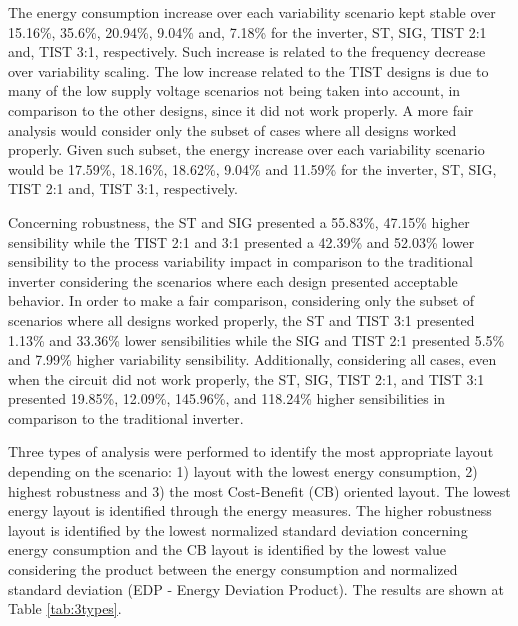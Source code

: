 \documentclass[pgmicro,mestrado,english]{iiufrgs}
\begin{document}
    The energy consumption increase over each variability scenario kept stable over 15.16\%, 35.6\%, 20.94\%, 9.04\% and, 7.18\% for the inverter, ST, SIG, TIST 2:1 and, TIST 3:1, respectively. Such increase is related to the frequency decrease over variability scaling. The low increase related to the TIST designs is due to many of the low supply voltage scenarios not being taken into account, in comparison to the other designs, since it did not work properly. A more fair analysis would consider only the subset of cases where all designs worked properly. Given such subset, the energy increase over each variability scenario would be 17.59\%, 18.16\%, 18.62\%, 9.04\% and 11.59\% for the inverter, ST, SIG, TIST 2:1 and, TIST 3:1, respectively.
    
    
    
    Concerning robustness, the ST and SIG presented a 55.83\%, 47.15\% higher sensibility while the TIST 2:1 and 3:1 presented a 42.39\% and 52.03\% lower sensibility to the process variability impact in comparison to the traditional inverter considering the scenarios where each design presented acceptable behavior. In order to make a fair comparison, considering only the subset of scenarios where all designs worked properly, the ST and TIST 3:1 presented 1.13\% and 33.36\% lower sensibilities while the SIG and TIST 2:1 presented 5.5\% and 7.99\% higher variability sensibility. Additionally, considering all cases, even when the circuit did not work properly, the ST, SIG, TIST 2:1, and TIST 3:1 presented 19.85\%, 12.09\%, 145.96\%, and 118.24\% higher sensibilities in comparison to the traditional inverter. 
    

    
    
    Three types of analysis were performed to identify the most appropriate layout depending on the scenario: 1) layout with the lowest energy consumption, 2) highest robustness and 3) the most Cost-Benefit (CB) oriented layout. The lowest energy layout is identified through the energy measures. The higher robustness layout is identified by the lowest normalized standard deviation concerning energy consumption and the CB layout is identified by the lowest value considering the product between the energy consumption and normalized standard deviation (EDP - Energy Deviation Product). The results are shown at Table \ref{tab:3types}.
    
\end{document}
